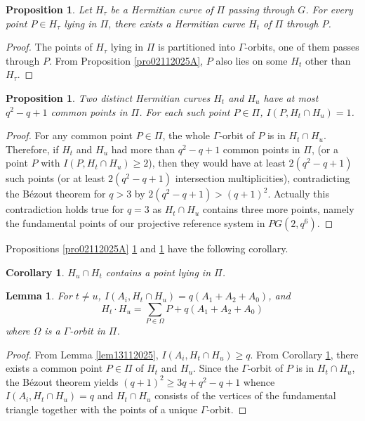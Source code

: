 \documentclass[9pt]{article}
\theoremstyle{plain}
\newtheorem{cor}[thm]{Corollary}
\newtheorem{lem}[thm]{Lemma}
\newtheorem{prop}[thm]{Proposition}
\begin{document}
\begin{prop}
\label{pro02112025B} Let $H_\tau$ be a Hermitian curve of $\Pi$ passing through $G$. For every point $P\in H_\tau$ lying in $\Pi$, there exists a Hermitian curve $H_t$ of $\Pi$ through $P$. 
\end{prop}
\begin{proof} The points of $H_\tau$ lying in $\Pi$ is partitioned into $\Gamma$-orbits, one of them passes through $P$. From Proposition \ref{pro02112025A}, $P$ also lies on some $H_t$ other than $H_\tau$.  
\end{proof}
\begin{prop}
\label{pro13112025} Two distinct Hermitian curves $H_t$ and $H_u$ have at most $q^2-q+1$ common points in $\Pi$. For each such point $P\in \Pi$, $I(P,H_t\cap H_u)=1$.  
\end{prop}
\begin{proof} For any common point $P\in \Pi$, the whole $\Gamma$-orbit of $P$ is in $H_t\cap H_u$. Therefore, if $H_t$ and $H_u$ had more than $q^2-q+1$ common points in $\Pi$, (or a point $P$ with $I(P,H_t\cap H_u)\ge 2$), then they would have at least $2(q^2-q+1)$ such points (or at least $2(q^2-q+1)$ intersection multiplicities), contradicting the B\'ezout theorem for $q>3$ by $2(q^2-q+1)>(q+1)^2$. Actually this contradiction holds true for $q=3$ as $H_t\cap H_u$ contains three more points, namely the fundamental points of our projective reference system in $PG(2,q^6)$.   
\end{proof} 
Propositions \ref{pro02112025A} \ref{pro02112025B} and \ref{pro13112025} have the following corollary.
\begin{cor}
\label{pro13112025A}  $H_u\cap H_t$ contains a point lying in $\Pi$. 
\end{cor}
\begin{lem}
\label{lem13112025B} For $t\neq u$, $I(A_i,H_t\cap H_u)=q(A_1+A_2+A_0)$, and $$H_t\cdot H_u=\sum_{P\in \Omega}P+q(A_1+A_2+A_0)$$ where $\Omega$ is a $\Gamma$-orbit in $\Pi$.  
\end{lem}
\begin{proof} From Lemma \ref{lem13112025}, $I(A_i,H_t\cap H_u)\ge q$. From Corollary \ref{pro13112025A}, there exists a common point $P\in \Pi$ of $H_t$ and $H_u$. Since the $\Gamma$-orbit of $P$ is in $H_t\cap H_u$,
the B\'ezout theorem yields $(q+1)^2\ge 3q +q^2-q+1$ whence $I(A_i,H_t\cap H_u)=q$ and $H_t\cap H_u$ consists of the vertices of the fundamental triangle together with the points of a unique $\Gamma$-orbit. 
\end{proof}
\end{document}
